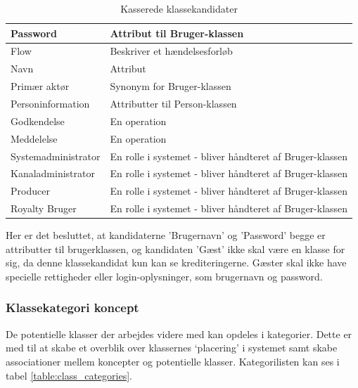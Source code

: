 \begin{table}[H]
\begin{tabularx}{\textwidth}{|X|X|}
        \hline
        Password & Attribut til Bruger-klassen\\
        \hline
        Flow & Beskriver et hændelsesforløb\\
        \hline
        Navn & Attribut \\
        \hline
        Primær aktør &  Synonym for Bruger-klassen\\
        \hline
        Personinformation &  Attributter til Person-klassen\\
        \hline
        Godkendelse & En operation \\
        \hline
        Meddelelse & En operation \\
        \hline
        Systemadministrator & En rolle i systemet - bliver håndteret af Bruger-klassen \\
        \hline
        Kanaladministrator & En rolle i systemet - bliver håndteret af Bruger-klassen \\
        \hline 
        Producer & En rolle i systemet - bliver håndteret af Bruger-klassen \\
        \hline
        Royalty Bruger & En rolle i systemet - bliver håndteret af Bruger-klassen \\
        \hline
    \end{tabularx}
    \caption{Kasserede klassekandidater}
    \label{table:deleted_class_candidates}
\end{table}


Her er det besluttet, at kandidaterne 'Brugernavn' og 'Password' begge er attributter til brugerklassen, og kandidaten 'Gæst' ikke skal være en klasse for sig, da denne klassekandidat kun kan se krediteringerne. Gæster skal ikke have specielle rettigheder eller login-oplysninger, som brugernavn og password.


\subsubsection{Klassekategori koncept}
De potentielle klasser der arbejdes videre med kan opdeles i kategorier. Dette er med til at skabe et overblik over klassernes ‘placering’ i systemet samt skabe associationer mellem koncepter og potentielle klasser.
Kategorilisten kan ses i tabel \ref{table:class_categories}.

